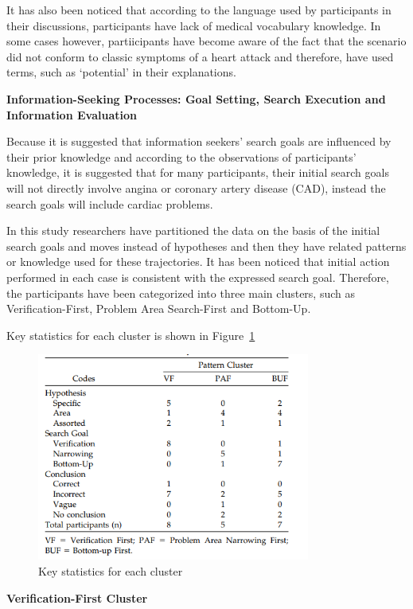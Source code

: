 \documentclass[]{article}
\begin{document}
It has also been noticed that according to the language used by participants in their discussions, participants have lack of medical vocabulary knowledge. In some cases however, partiicipants have become aware of the fact that the scenario did not conform to classic symptoms of a heart attack and therefore, have used terms, such as ‘potential’ in their explanations. 

\textbf{Information-Seeking Processes: Goal Setting, Search Execution and Information Evaluation}

Because it is suggested that information seekers’ search goals are influenced by their prior knowledge and according to the observations of participants’ knowledge, it is suggested that for many participants, their initial search goals will not directly involve angina or coronary artery disease (CAD), instead the search goals will include cardiac problems.    

In this study researchers have partitioned the data on the basis of the initial search goals and moves instead of hypotheses and then they have related patterns or knowledge used for these trajectories. It has been noticed that initial action performed in each case is consistent with the expressed search goal. Therefore, the participants have been categorized into three main clusters, such as Verification-First, Problem Area Search-First and Bottom-Up. 

Key statistics for each cluster is shown in Figure~\ref{fig10}

\begin{figure}[t!]
	\includegraphics[width=0.8\textwidth]{Capture10.png}
	\caption{Key statistics for each cluster\label{fig10}}
\end{figure}

\textbf{Verification-First Cluster}
\end{document}
